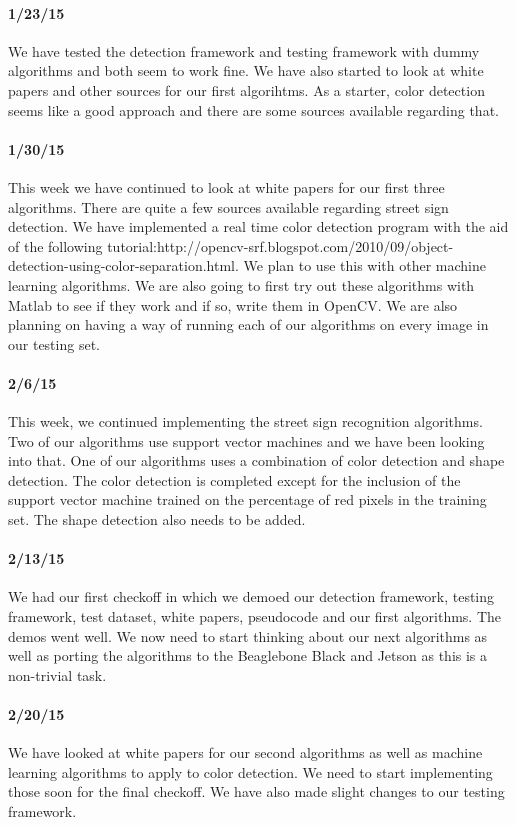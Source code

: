 \documentclass[letterpaper,10pt,titlepage]{article}
\begin{document}
    \paragraph*{1/23/15}
    We have tested the detection framework and testing framework with dummy
    algorithms and both seem to work fine. We have also started to look at 
    white papers and other sources for our first algorihtms. As a starter, 
    color detection seems like a good approach and there are some sources 
    available regarding that.
    \paragraph*{1/30/15}
    This week we have continued to look at white papers for our first three 
    algorithms. There are quite a few sources available regarding street sign
    detection. We have implemented a real time color detection program with 
    the aid of the following tutorial:http://opencv-srf.blogspot.com/2010/09/object-detection-using-color-separation.html.
    We plan to use this with other machine learning algorithms. We are also 
    going to first try out these algorithms with Matlab to see if they work and
    if so, write them in OpenCV. We are also planning on having a way of 
    running each of our algorithms on every image in our testing set. 
    \paragraph*{2/6/15}
    This week, we continued implementing the street sign recognition 
    algorithms. Two of our algorithms use support vector machines and we have 
    been looking into that. One of our algorithms uses a combination of color
    detection and shape detection. The color detection is completed except for
    the inclusion of the support vector machine trained on the percentage of 
    red pixels in the training set. The shape detection also needs to be 
    added. 
    \paragraph*{2/13/15}
    We had our first checkoff in which we demoed our detection framework, 
    testing framework, test dataset, white papers, pseudocode and our first 
    algorithms. The demos went well. We now need to start thinking about our 
    next algorithms as well as porting the algorithms to the Beaglebone Black
    and Jetson as this is a non-trivial task.
    \paragraph*{2/20/15}
    We have looked at white papers for our second algorithms as well as 
    machine learning algorithms to apply to color detection. We need to start 
    implementing those soon for the final checkoff. We have also made slight 
    changes to our testing framework. 
\end{document}
